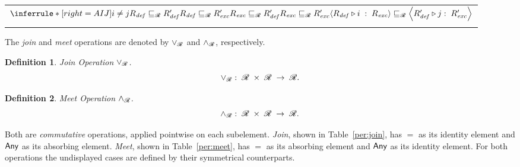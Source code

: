 \documentclass[11pt]{article}
\newtheorem{definition}{Definition}
\begin{document}
\begin{table}[hbtp]
\begin{tabular}{@{}c@{}}
$\inferrule*[right=AIJ]
{i \neq j \\ \rel_{\mathit{def}} \rleq \rel'_{\mathit{def}} \\ \rel_{\mathit{def}} \rleq \rel'_{\mathit{exc}} \\ \rel_{\mathit{exc}} \rleq \rel'_{\mathit{def}} \\ \rel_{\mathit{exc}} \rleq \rel'_{\mathit{exc}}}
{\relai \rleq \aerel{\rel'_{\mathit{def}}}{j}{\rel'_{\mathit{exc}}}}
$ 
\\\\
\bottomrule
\end{tabular}
\end{table}

The \emph{join} and \emph{meet} operations are denoted by $\mathrel{\vee_{\kern-0.25pt\mathscr{R}}}$ and $\mathrel{\wedge_{\kern0.15pt\mathscr{R}}}$,
respectively.
\begin{definition}{Join Operation $\mathrel{\vee_{\kern-0.25pt\mathscr{R}}}$.}\label{ch7:joinoperationper:definition}
\[
 \rjoin\;  : \;\rdom\; \times \;\rdom\; \to \;\rdom. %
\]
\end{definition}

\begin{definition}{Meet Operation $\mathrel{\wedge_{\kern0.15pt\mathscr{R}}}$.}\label{ch7:meetoperationper:definition}
\[
\mathrel{\wedge_{\kern0.15pt\mathscr{R}}}\;  : \;\mathscr{R} \; \times \;\mathscr{R} \; \to \;\mathscr{R}. 
\]
\end{definition}

\noindent Both are \emph{commutative} 
operations, applied pointwise on each subelement. \emph{Join}, shown in 
Table~\ref{per:join}, has $\equal$ as its identity element and $\textsf{Any}$ as its 
absorbing element. \emph{Meet}, shown in Table~\ref{per:meet}, has $\equal$ as 
its absorbing element and $\textsf{Any}$ as its identity element. For both operations 
the undisplayed cases are defined by their symmetrical counterparts.
\end{document}
